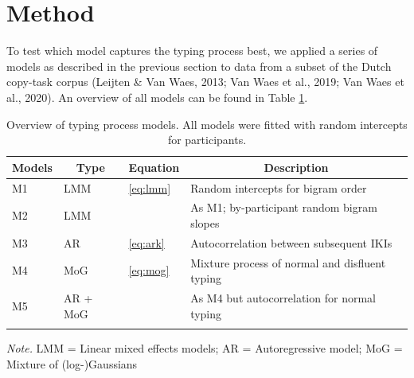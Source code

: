 \documentclass[english,man,floatsintext]{apa7}
\begin{document}
\hypertarget{method}{%
\section{Method}\label{method}}

To test which model captures the typing process best, we applied a series of models as described in the previous section to data from a subset of the Dutch copy-task corpus (Leijten \& Van Waes, 2013; Van Waes et al., 2019; Van Waes et al., 2020). An overview of all models can be found in Table \ref{tab:models}.

\begin{table}[!ht]

\begin{center}
\begin{threeparttable}

\caption{\label{tab:models}Overview of typing process models. All models were fitted with random intercepts for participants.}

\begin{tabular}{llll}
\toprule
Models & \multicolumn{1}{c}{Type} & \multicolumn{1}{c}{Equation} & \multicolumn{1}{c}{Description}\\
\midrule
M1 & LMM & \ref{eq:lmm} & Random intercepts for bigram order\\
M2 & LMM &  & As M1; by-participant random bigram slopes\\
M3 & AR & \ref{eq:ark} & Autocorrelation between subsequent IKIs\\
M4 & MoG & \ref{eq:mog} & Mixture process of normal and disfluent typing\\
M5 & AR + MoG &  & As M4 but autocorrelation for normal typing\\
\bottomrule
\addlinespace
\end{tabular}

\begin{tablenotes}[para]
\normalsize{\textit{Note.} LMM = Linear mixed effects models; AR = Autoregressive model; MoG = Mixture of (log-)Gaussians}
\end{tablenotes}

\end{threeparttable}
\end{center}

\end{table}
\end{document}
